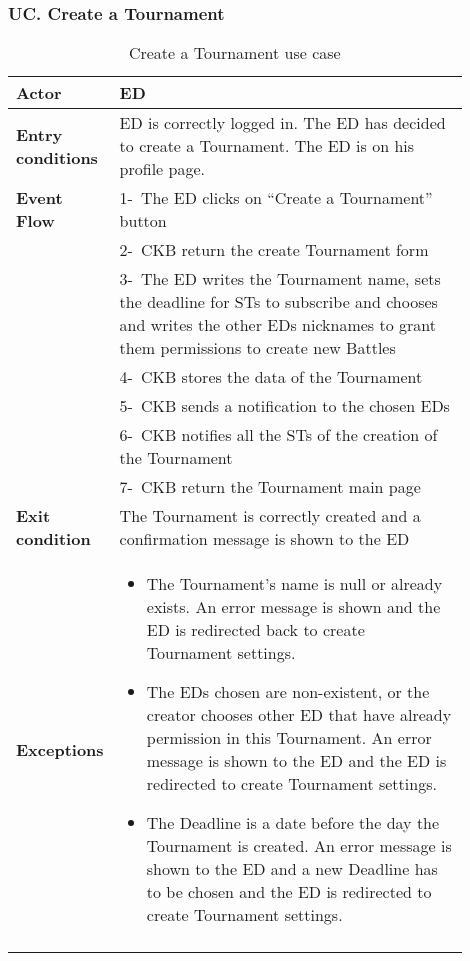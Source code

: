 \subsubsection*{UC\cuc . Create a Tournament}
\begin{center}
    \begin{longtable}{|l|p{0.9\linewidth}|}
        \hline
        \textbf{Actor}            & ED                                                                                                                                                                                       \\
        \hline
        \textbf{Entry conditions} & ED is correctly logged in. The ED has decided to create a Tournament. The ED is on his profile page.        \\
        \hline
        \textbf{Event Flow}       & 1-\ The ED clicks on “Create a Tournament” button        \\
        & 2-\ CKB return the create Tournament form        \\
        & 3-\ The ED writes the Tournament name, sets the deadline for STs to subscribe and chooses and writes the other EDs nicknames to grant them permissions to create new Battles        \\
        & 4-\ CKB stores the data of the Tournament        \\
        & 5-\ CKB sends a notification to the chosen EDs        \\
        & 6-\ CKB notifies all the STs of the creation of the Tournament        \\
        & 7-\ CKB return the Tournament main page        \\
        \hline
        \textbf{Exit condition}   & The Tournament is correctly created and a confirmation message is shown to the ED        \\
        \hline
        \textbf{Exceptions}        & \begin{itemize}
            \item The Tournament’s name is null or already exists. An error message is shown and the ED is redirected back to create Tournament settings.
            \item The EDs chosen are non-existent, or the creator chooses other ED that have already permission in this Tournament. An error message is shown to the ED and the ED is redirected to create Tournament settings.
            \item The Deadline is a date before the day the Tournament is created. An error message is shown to the ED and a new Deadline has to be chosen and the ED  is redirected to create Tournament settings.
         \end{itemize}    \\
        \hline
        \caption{Create a Tournament use case}
        \label{tab: create_a_Tournament_use_case}
    \end{longtable}
\end{center}

